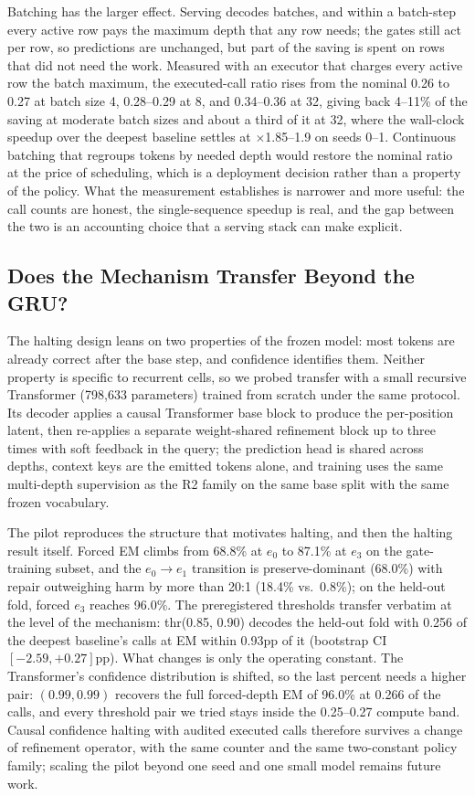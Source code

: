 ﻿\documentclass[11pt]{article}
\begin{document}
Batching has the larger effect. Serving decodes batches, and within a batch-step every active row pays the maximum depth that any row needs; the gates still act per row, so predictions are unchanged, but part of the saving is spent on rows that did not need the work. Measured with an executor that charges every active row the batch maximum, the executed-call ratio rises from the nominal 0.26 to 0.27 at batch size 4, 0.28--0.29 at 8, and 0.34--0.36 at 32, giving back 4--11\% of the saving at moderate batch sizes and about a third of it at 32, where the wall-clock speedup over the deepest baseline settles at $\times$1.85--1.9 on seeds 0--1. Continuous batching that regroups tokens by needed depth would restore the nominal ratio at the price of scheduling, which is a deployment decision rather than a property of the policy. What the measurement establishes is narrower and more useful: the call counts are honest, the single-sequence speedup is real, and the gap between the two is an accounting choice that a serving stack can make explicit.

\subsection{Does the Mechanism Transfer Beyond the GRU?}
\label{sec:exp-trans}
The halting design leans on two properties of the frozen model: most tokens are already correct after the base step, and confidence identifies them. Neither property is specific to recurrent cells, so we probed transfer with a small recursive Transformer (798{,}633 parameters) trained from scratch under the same protocol. Its decoder applies a causal Transformer base block to produce the per-position latent, then re-applies a separate weight-shared refinement block up to three times with soft feedback in the query; the prediction head is shared across depths, context keys are the emitted tokens alone, and training uses the same multi-depth supervision as the R2 family on the same base split with the same frozen vocabulary.

The pilot reproduces the structure that motivates halting, and then the halting result itself. Forced EM climbs from 68.8\% at $e_0$ to 87.1\% at $e_3$ on the gate-training subset, and the $e_0 \rightarrow e_1$ transition is preserve-dominant (68.0\%) with repair outweighing harm by more than 20:1 (18.4\% vs.\ 0.8\%); on the held-out fold, forced $e_3$ reaches 96.0\%. The preregistered thresholds transfer verbatim at the level of the mechanism: thr(0.85, 0.90) decodes the held-out fold with 0.256 of the deepest baseline's calls at EM within 0.93pp of it (bootstrap CI $[-2.59, +0.27]$pp). What changes is only the operating constant. The Transformer's confidence distribution is shifted, so the last percent needs a higher pair: $(0.99, 0.99)$ recovers the full forced-depth EM of 96.0\% at 0.266 of the calls, and every threshold pair we tried stays inside the 0.25--0.27 compute band. Causal confidence halting with audited executed calls therefore survives a change of refinement operator, with the same counter and the same two-constant policy family; scaling the pilot beyond one seed and one small model remains future work.
\end{document}
